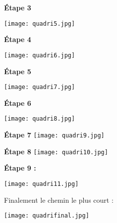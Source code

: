 \begin{multicols}{2}

\begin{center}

\textbf{\'Etape 3}

\texttt{[image: quadri5.jpg]}
\end{center}


\begin{center}
\textbf{\'Etape 4}

\texttt{[image: quadri6.jpg]}
\end{center}

\end{multicols}
\begin{multicols}{2}
\begin{center}

\textbf{\'Etape 5}

\texttt{[image: quadri7.jpg]}
\end{center}



\begin{center}

\textbf{\'Etape 6}

\texttt{[image: quadri8.jpg]}
\end{center}

\end{multicols}
\begin{multicols}{2}

\begin{center}
\textbf{\'Etape 7}
\texttt{[image: quadri9.jpg]}
\end{center}


\begin{center}

\textbf{\'Etape 8}
\texttt{[image: quadri10.jpg]}
\end{center}

\end{multicols}
\begin{multicols}{2}

\begin{center}
\textbf{\'Etape 9 :}

\texttt{[image: quadri11.jpg]}
\end{center}

Finalement le chemin le plus court :

\begin{center}
\texttt{[image: quadrifinal.jpg]}
\end{center}
\end{multicols}


